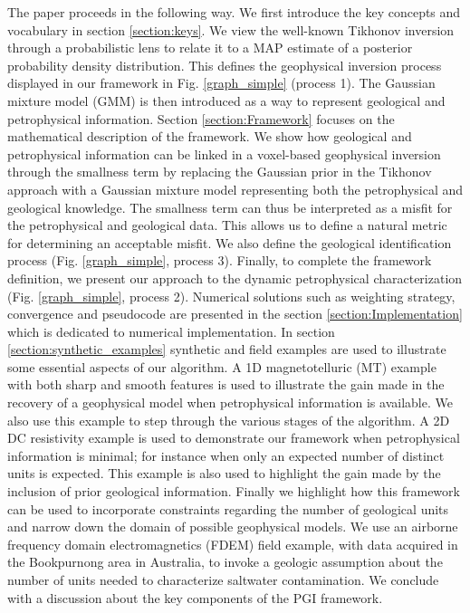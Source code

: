 \documentclass[extra]{gji} %
\begin{document}
The paper proceeds in the following way. We first introduce the key concepts and vocabulary in section \ref{section:keys}. We view the well-known Tikhonov inversion through a probabilistic lens to relate it to a MAP estimate of a posterior probability density distribution. This defines the geophysical inversion process displayed in our framework in Fig. \ref{graph_simple} (process 1). The Gaussian mixture model (GMM) is then introduced as a way to represent geological and petrophysical information. Section \ref{section:Framework} focuses on the mathematical description of the framework. We show how geological and petrophysical information can be linked in a voxel-based geophysical inversion through the smallness term by replacing the Gaussian prior in the Tikhonov approach with a Gaussian mixture model representing both the petrophysical and geological knowledge. The smallness term can thus be interpreted as a misfit for the petrophysical and geological data. This allows us to define a natural metric for determining an acceptable misfit. We also define the geological identification process (Fig. \ref{graph_simple}, process 3). Finally, to complete the framework definition, we present our approach to the dynamic petrophysical characterization (Fig. \ref{graph_simple}, process 2). Numerical solutions such as weighting strategy, convergence and pseudocode are presented in the section \ref{section:Implementation} which is dedicated to numerical implementation. In section \ref{section:synthetic_examples} synthetic and field examples are used to illustrate some essential aspects of our algorithm. A 1D magnetotelluric (MT) example with both sharp and smooth features is used to illustrate the gain made in the recovery of a geophysical model when petrophysical information is available. We also use this example to step through the various stages of the algorithm. A 2D DC resistivity example is used to demonstrate our framework when petrophysical information is minimal; for instance when only an expected number of distinct units is expected. This example is also used to highlight the gain made by the inclusion of prior geological information. Finally we highlight how this framework can be used to incorporate constraints regarding the number of geological units and narrow down the domain of possible geophysical models. We use an airborne frequency domain electromagnetics (FDEM) field example, with data acquired in the Bookpurnong area in Australia, to invoke a geologic assumption about the number of units needed to characterize saltwater contamination. We conclude with a discussion about the key components of the PGI framework.
\end{document}
